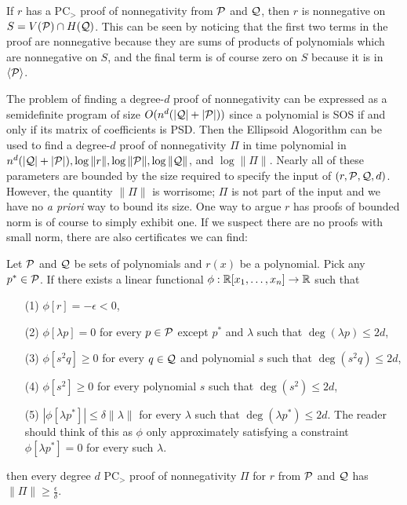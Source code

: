 If $r$ has a PC$_>$ proof of nonnegativity from $\mathcal P$ and $\mathcal Q$, then $r$ is nonnegative on $S = V(\mathcal P) \cap H(\mathcal Q)$. This can be seen by noticing that the first two terms in the proof are nonnegative because they are sums of products of polynomials which are nonnegative on $S$, and the final term is of course zero on $S$ because it is in $\langle \mathcal P \rangle$.

The problem of finding a degree-$d$ proof of nonnegativity can be expressed as a semidefinite program of size $O(n^d(|\mathcal Q| + |\mathcal P|))$ since a polynomial is SOS if and only if its matrix of coefficients is PSD. Then the Ellipsoid Alogorithm can be used to find a degree-$d$ proof of nonnegativity $\Pi$ in time polynomial in $n^{d}(|\mathcal Q| + |\mathcal P|), \log \|r\|, \log \|\mathcal P\|, \log \|\mathcal Q\|$,  and $\log \|\Pi\|$. Nearly all of these parameters are bounded by the size required to specify the input of $(r,\mathcal P,\mathcal Q,d)$. However, the quantity $\|\Pi\|$ is worrisome; $\Pi$ is not part of the input and we have no \emph{a priori} way to bound its size. One way to argue $r$ has proofs of bounded norm is of course to simply exhibit one. If we suspect there are no proofs with small norm, there are also certificates we can find:
\begin{lemma}\label{lem:prelim_dual_cert}
Let $\mathcal P$ and $\mathcal Q$ be sets of polynomials and $r(x)$ be a polynomial. Pick any $p^* \in \mathcal P$. If there exists a linear functional $\phi: \mathbb R[x_1,\dots,x_n] \rightarrow \mathbb R$ such that
\begin{enumerate}
\item[(1)] $\phi[r] = -\epsilon < 0$,
\item[(2)] $\phi[\lambda p] = 0$ for every $p \in \mathcal P$ except $p^*$ and $\lambda$ such that $\deg (\lambda p) \leq 2d$,
\item[(3)] $\phi[s^2q] \geq 0$ for every $q \in \mathcal Q$ and polynomial $s$ such that $\deg (s^2q) \leq 2d$,
\item[(4)] $\phi[s^2] \geq 0$ for every polynomial $s$ such that $\deg (s^2) \leq 2d$,
\item[(5)] $|\phi[\lambda p^*]| \leq \delta \|\lambda\|$ for every $\lambda$ such that $\deg (\lambda p^*) \leq 2d$. The reader should think of this as $\phi$ only approximately satisfying a constraint $\phi[\lambda p^*] = 0$ for every such $\lambda$.
\end{enumerate}
then every degree $d$ PC$_>$ proof of nonnegativity $\Pi$ for $r$ from $\mathcal P$ and $\mathcal Q$ has $\|\Pi\| \geq \frac{\epsilon}{\delta}$.
\end{lemma}
